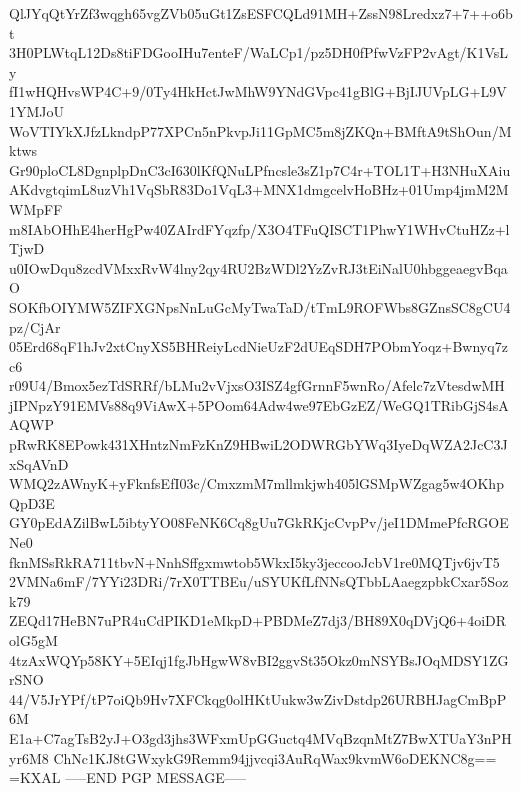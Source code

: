 QlJYqQtYrZf3wqgh65vgZVb05uGt1ZsESFCQLd91MH+ZssN98Lredxz7+7++o6bt
3H0PLWtqL12Ds8tiFDGooIHu7enteF/WaLCp1/pz5DH0fPfwVzFP2vAgt/K1VsLy
fI1wHQHvsWP4C+9/0Ty4HkHctJwMhW9YNdGVpc41gBlG+BjIJUVpLG+L9V1YMJoU
WoVTIYkXJfzLkndpP77XPCn5nPkvpJi11GpMC5m8jZKQn+BMftA9tShOun/Mktws
Gr90ploCL8DgnplpDnC3cI630lKfQNuLPfncsle3sZ1p7C4r+TOL1T+H3NHuXAiu
AKdvgtqimL8uzVh1VqSbR83Do1VqL3+MNX1dmgcelvHoBHz+01Ump4jmM2MWMpFF
m8IAbOHhE4herHgPw40ZAIrdFYqzfp/X3O4TFuQISCT1PhwY1WHvCtuHZz+lTjwD
u0IOwDqu8zcdVMxxRvW4lny2qy4RU2BzWDl2YzZvRJ3tEiNalU0hbggeaegvBqaO
SOKfbOIYMW5ZIFXGNpsNnLuGcMyTwaTaD/tTmL9ROFWbs8GZnsSC8gCU4pz/CjAr
05Erd68qF1hJv2xtCnyXS5BHReiyLcdNieUzF2dUEqSDH7PObmYoqz+Bwnyq7zc6
r09U4/Bmox5ezTdSRRf/bLMu2vVjxsO3ISZ4gfGrnnF5wnRo/Afelc7zVtesdwMH
jIPNpzY91EMVs88q9ViAwX+5POom64Adw4we97EbGzEZ/WeGQ1TRibGjS4sAAQWP
pRwRK8EPowk431XHntzNmFzKnZ9HBwiL2ODWRGbYWq3IyeDqWZA2JcC3JxSqAVnD
WMQ2zAWnyK+yFknfsEfI03c/CmxzmM7mllmkjwh405lGSMpWZgag5w4OKhpQpD3E
GY0pEdAZilBwL5ibtyYO08FeNK6Cq8gUu7GkRKjcCvpPv/jeI1DMmePfcRGOENe0
fknMSsRkRA711tbvN+NnhSffgxmwtob5WkxI5ky3jeccooJcbV1re0MQTjv6jvT5
2VMNa6mF/7YYi23DRi/7rX0TTBEu/uSYUKfLfNNsQTbbLAaegzpbkCxar5Sozk79
ZEQd17HeBN7uPR4uCdPIKD1eMkpD+PBDMeZ7dj3/BH89X0qDVjQ6+4oiDRolG5gM
4tzAxWQYp58KY+5EIqj1fgJbHgwW8vBI2ggvSt35Okz0mNSYBsJOqMDSY1ZGrSNO
44/V5JrYPf/tP7oiQb9Hv7XFCkqg0olHKtUukw3wZivDstdp26URBHJagCmBpP6M
E1a+C7agTsB2yJ+O3gd3jhs3WFxmUpGGuctq4MVqBzqnMtZ7BwXTUaY3nPHyr6M8
ChNc1KJ8tGWxykG9Remm94jjvcqi3AuRqWax9kvmW6oDEKNC8g==
=KXAL
-----END PGP MESSAGE-----
